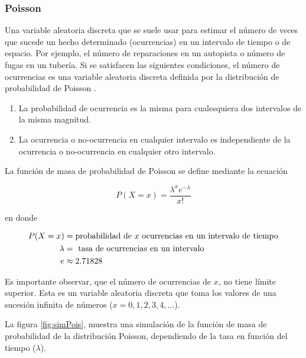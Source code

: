 \documentclass[
  11pt,
]{book}
\providecommand{\tightlist}{%
  \setlength{\itemsep}{0pt}\setlength{\parskip}{0pt}}
\theoremstyle{definition}
\theoremstyle{definition}
\theoremstyle{definition}
\theoremstyle{definition}
\theoremstyle{remark}
\begin{document}
\subsubsection{Poisson}\label{probabilidad-variable-aleatoria-discreta-distribucion-poisson}

Una variable aleatoria discreta que se suele usar para estimar el número de veces que sucede un hecho determinado (ocurrencias) en un intervalo de tiempo o de espacio. Por ejemplo, el número de reparaciones en un autopista o número de fugas en un tubería. Si se satisfacen las siguientes condiciones, el número de ocurrencias es una variable aleatoria discreta definida por la distribución de probabilidad de Poisson \citep[página 211]{anderson}.

\begin{enumerate}
\def\labelenumi{\arabic{enumi}.}
\tightlist
\item
  La probabilidad de ocurrencia es la misma para cualesquiera dos intervalos de la misma magnitud.
\item
  La ocurrencia o no-ocurrencia en cualquier intervalo es independiente de la ocurrencia o no-ocurrencia en cualquier otro intervalo.
\end{enumerate}

La función de masa de probabilidad de Poisson se define mediante la ecuación

\begin{equation}
P(X = x) = \dfrac{\lambda^xe^{-\lambda}}{x!}
\label{eq:poisson}
\end{equation}

en donde

\begin{equation}
\notag
\begin{split}
P(X = x) &= \text{probabilidad de } x \text{ ocurrencias en un intervalo de tiempo}\\
\lambda &= \text{ tasa de ocurrencias en un intervalo}\\
e &\approx 2.71828\\
\end{split}
\end{equation}

Es importante observar, que el número de ocurrencias de \(x\), no tiene límite superior. Esta es un variable aleatoria discreta que toma los valores de una sucesión infinita de números (\(x = 0,1,2,3,4,\ldots\)).

La figura \ref{fig:simPois}, muestra una simulación de la función de masa de probabilidad de la distribución Poisson, dependiendo de la tasa en función del tiempo (\(\lambda\)).
\end{document}
